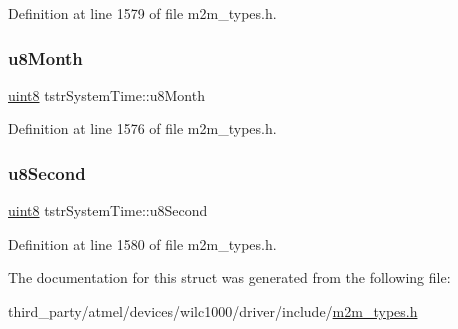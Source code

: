 Definition at line 1579 of file m2m\+\_\+types.\+h.

\mbox{\label{structtstrSystemTime_a4f0893418dc36ad7622444c42e8c9568}} 
\subsubsection{\texorpdfstring{u8\+Month}{u8Month}}
{\footnotesize\ttfamily \hyperlink{group__DataT_ga4df709a77647e870bbf1d955b8edc9a6}{uint8} tstr\+System\+Time\+::u8\+Month}



Definition at line 1576 of file m2m\+\_\+types.\+h.

\mbox{\label{structtstrSystemTime_a612436cd80c73e608cbc32edc5f74f90}} 
\subsubsection{\texorpdfstring{u8\+Second}{u8Second}}
{\footnotesize\ttfamily \hyperlink{group__DataT_ga4df709a77647e870bbf1d955b8edc9a6}{uint8} tstr\+System\+Time\+::u8\+Second}



Definition at line 1580 of file m2m\+\_\+types.\+h.



The documentation for this struct was generated from the following file\+:\begin{DoxyCompactItemize}
\item 
third\+\_\+party/atmel/devices/wilc1000/driver/include/\hyperlink{m2m__types_8h}{m2m\+\_\+types.\+h}\end{DoxyCompactItemize}
